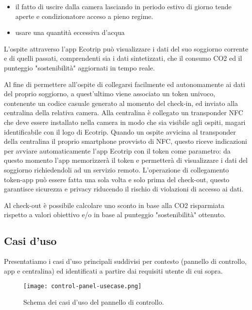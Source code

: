 \begin{itemize}
    \item il fatto di uscire dalla camera lasciando in periodo estivo di giorno tende aperte e condizionatore acceso a pieno regime.
    \item usare una quantità eccessiva d'acqua
\end{itemize}

L'ospite attraverso l'app Ecotrip può visualizzare i dati del suo soggiorno
corrente e di quelli passati, comprendenti sia i dati sintetizzati, che il
consumo CO2 ed il punteggio "sostenibilità" aggiornati in tempo reale.

Al fine di permettere all'ospite di collegarsi facilmente ed autonomamente ai
dati del proprio soggiorno, a quest'ultimo viene associato un token univoco,
contenente un codice casuale generato al momento del check-in, ed inviato alla
centralina della relativa camera. Alla centralina è collegato un transponder NFC
che deve essere installato nella camera in modo che sia visibile agli ospiti,
magari identificabile con il logo di Ecotrip. Quando un ospite avvicina al
transponder della centralina il proprio smartphone provvisto di NFC, questo
riceve indicazioni per avviare automaticamente l'app Ecotrip con il token come
parametro: da questo momento l'app memorizzerà il token e permetterà di
visualizzare i dati del soggiorno richiedendoli ad un servizio remoto.
L'operazione di collegamento token-app può essere fatta una sola volta e solo
prima del check-out, questo garantisce sicurezza e privacy riducendo il rischio
di violazioni di accesso ai dati.

Al check-out è possibile calcolare uno sconto in base alla CO2 risparmiata
rispetto a valori obiettivo e/o in base al punteggio "sostenibilità" ottenuto.

\subsection{Casi d'uso}
Presentatiamo i casi d'uso principali suddivisi per contesto (pannello di controllo, app e centralina) ed 
identificati a partire dai requisiti utente di cui sopra. 

\begin{figure}[H]
    \texttt{[image: control-panel-usecase.png]}
    \centering
    \caption[control-panel-usecase]{Schema dei casi d'uso del pannello di controllo.}
    \label{fig:cp-usecase}
\end{figure}


